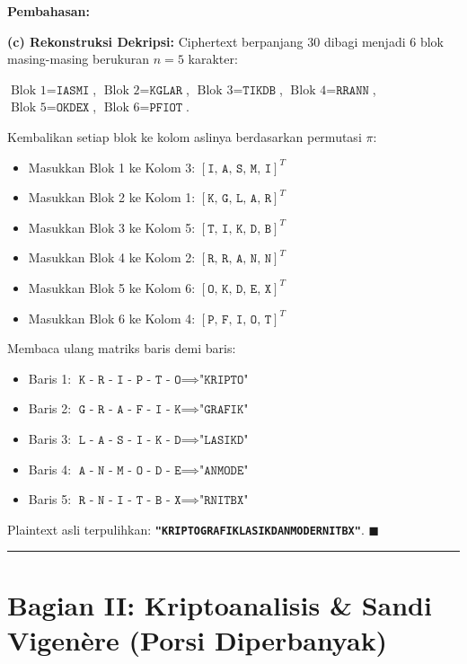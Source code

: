 \documentclass[11pt,a4paper]{article}
\newenvironment{solusi}{\noindent\textbf{\textsf{Pembahasan:}}\par\vspace{0.2em}}{\hfill$\blacksquare$\vspace{1em}\par\hrule\vspace{1em}}
\begin{document}
\begin{solusi}
\vspace{0.2cm}
\textbf{(c) Rekonstruksi Dekripsi:}
Ciphertext berpanjang 30 dibagi menjadi 6 blok masing-masing berukuran $n = 5$ karakter:
\begin{center}
$\text{Blok 1} = \texttt{IASMI}$, $\text{Blok 2} = \texttt{KGLAR}$, $\text{Blok 3} = \texttt{TIKDB}$, $\text{Blok 4} = \texttt{RRANN}$, $\text{Blok 5} = \texttt{OKDEX}$, $\text{Blok 6} = \texttt{PFIOT}$.
\end{center}
Kembalikan setiap blok ke kolom aslinya berdasarkan permutasi $\pi$:
\begin{itemize}
    \item Masukkan Blok 1 ke Kolom 3: $[\texttt{I, A, S, M, I}]^T$
    \item Masukkan Blok 2 ke Kolom 1: $[\texttt{K, G, L, A, R}]^T$
    \item Masukkan Blok 3 ke Kolom 5: $[\texttt{T, I, K, D, B}]^T$
    \item Masukkan Blok 4 ke Kolom 2: $[\texttt{R, R, A, N, N}]^T$
    \item Masukkan Blok 5 ke Kolom 6: $[\texttt{O, K, D, E, X}]^T$
    \item Masukkan Blok 6 ke Kolom 4: $[\texttt{P, F, I, O, T}]^T$
\end{itemize}
Membaca ulang matriks baris demi baris:
\begin{itemize}
    \item Baris 1: $\texttt{K - R - I - P - T - O} \implies \texttt{"KRIPTO"}$
    \item Baris 2: $\texttt{G - R - A - F - I - K} \implies \texttt{"GRAFIK"}$
    \item Baris 3: $\texttt{L - A - S - I - K - D} \implies \texttt{"LASIKD"}$
    \item Baris 4: $\texttt{A - N - M - O - D - E} \implies \texttt{"ANMODE"}$
    \item Baris 5: $\texttt{R - N - I - T - B - X} \implies \texttt{"RNITBX"}$
\end{itemize}
Plaintext asli terpulihkan: \textbf{\texttt{"KRIPTOGRAFIKLASIKDANMODERNITBX"}}.
\end{solusi}

\newpage
\section{Bagian II: Kriptoanalisis \& Sandi Vigenère (Porsi Diperbanyak)}
\end{document}
